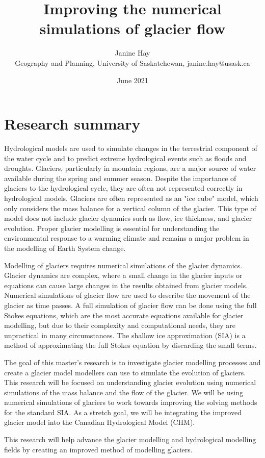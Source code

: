 \documentclass{article}
\title{Improving the numerical simulations of glacier flow}
\author{Janine Hay \\
        \small Geography and Planning, University of Saskatchewan, janine.hay@usask.ca\\

}
\date{June 2021} %
\begin{document}
\maketitle
\newpage
\tableofcontents
\newpage
\section{Research summary}
Hydrological models are used to simulate changes in the terrestrial component of the water cycle and to predict extreme hydrological events such as floods and droughts. Glaciers, particularly in mountain regions, are a major source of water available during the spring and summer season. Despite the importance of glaciers to the hydrological cycle, they are often not represented correctly in hydrological models. Glaciers are often represented as an "ice cube" model, which only considers the mass balance for a vertical column of the glacier. This type of model does not include glacier dynamics such as flow, ice thickness, and glacier evolution. Proper glacier modelling is essential for understanding the environmental response to a warming climate and remains a major problem in the modelling of Earth System change.  

Modelling of glaciers requires numerical simulations of the glacier dynamics. Glacier dynamics are complex, where a small change in the glacier inputs or equations can cause large changes in the results obtained from glacier models. Numerical simulations of glacier flow are used to describe the movement of the glacier as time passes. A full simulation of glacier flow can be done using the full Stokes equations, which are the most accurate equations available for glacier modelling, but due to their complexity and computational needs, they are unpractical in many circumstances. The shallow ice approximation (SIA) is a method of approximating the full Stokes equation by discarding the small terms.

The goal of this master's research is to investigate glacier modelling processes and create a glacier model modellers can use to simulate the evolution of glaciers. This research will be focused on understanding glacier evolution using numerical simulations of the mass balance and the flow of the glacier. We will be using numerical simulations of glaciers to work towards improving the solving methods for the standard SIA. As a stretch goal, we will be integrating the improved glacier model into the Canadian Hydrological Model (CHM).

This research will help advance the glacier modelling and hydrological modelling fields by creating an improved method of modelling glaciers. 
\end{document}
